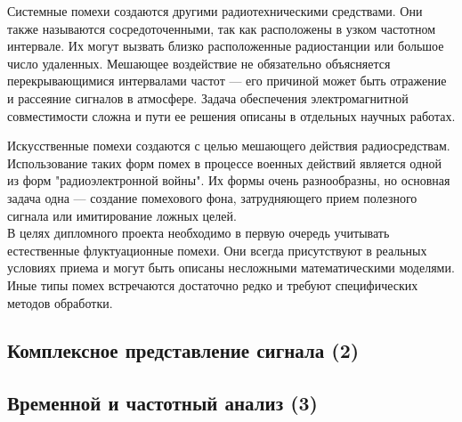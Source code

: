 Системные помехи создаются другими радиотехническими средствами. Они также называются сосредоточенными, так как расположены в узком частотном интервале. Их могут вызвать близко расположенные радиостанции или большое число удаленных. Мешающее воздействие не обязательно объясняется перекрывающимися интервалами частот --- его причиной может быть отражение и рассеяние сигналов в атмосфере. Задача обеспечения электромагнитной совместимости сложна и пути ее решения описаны в отдельных научных работах.

Искусственные помехи создаются с целью мешающего действия радиосредствам. Использование таких форм помех в процессе военных действий является одной из форм "радиоэлектронной войны". Их формы очень разнообразны, но основная задача одна --- создание помехового фона, затрудняющего прием полезного сигнала или имитирование ложных целей.
\\

В целях дипломного проекта необходимо в первую очередь учитывать естественные флуктуационные помехи. Они всегда присутствуют в реальных условиях приема и могут быть описаны несложными математическими моделями. Иные типы помех встречаются достаточно редко и требуют специфических методов обработки.

\subsection{Комплексное представление сигнала (2)}
\subsection{Временной и частотный анализ (3)}
